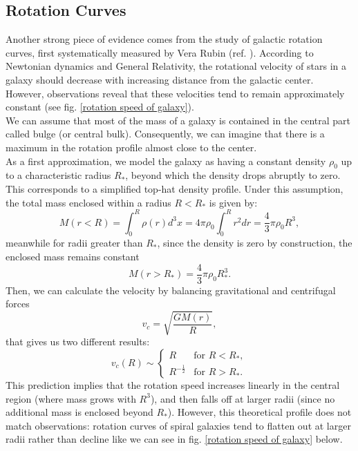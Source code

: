 \subsection{Rotation Curves}
Another strong piece of evidence comes from the study of galactic rotation curves, first systematically measured by Vera Rubin (ref. \cite{Vera-Rubin}). According to Newtonian dynamics and General Relativity, the rotational velocity of stars in a galaxy should decrease with increasing distance from the galactic center. However, observations reveal that these velocities tend to remain approximately constant (see fig. \ref{rotation speed of galaxy}).\\
We can assume that most of the mass of a galaxy is contained in the central part called bulge (or central bulk). Consequently, we can imagine that there is a maximum in the rotation profile almost close to the center.\\
 As a first approximation, we model the galaxy as having a constant density $\rho_0$ up to a characteristic radius $R_*$, beyond which the density drops abruptly to zero. This corresponds to a simplified top-hat density profile.
 Under this assumption, the total mass enclosed within a radius $R < R_*$ is given by:
\begin{equation}
    M(r<R) = \int_0 ^R \rho(r) d^3 x=4\pi\rho_0 \int_0 ^R r^2 dr = \frac{4}{3} \pi \rho_0 R^3,
\end{equation}
meanwhile for radii greater than $R_*$, since the density is zero by construction, the enclosed mass remains constant
\begin{equation}
    M(r>R_*) = \frac{4}{3} \pi \rho_0 R^3_*.
\end{equation}
Then, we can calculate the velocity by balancing gravitational and centrifugal forces
\begin{equation}
    v_c = \sqrt{\frac{GM (r)}{R}},
\end{equation}
that gives us two different results:
\begin{equation}
    v_c(R) \sim 
    \begin{cases}
        R & \text{for } R < R_*, \\
        R^{-\frac{1}{2}} & \text{for } R > R_*.
    \end{cases}
\end{equation}
This prediction implies that the rotation speed increases linearly in the central region (where mass grows with $R^3$), and then falls off at larger radii (since no additional mass is enclosed beyond $R_*$).
However, this theoretical profile does not match observations: rotation curves of spiral galaxies tend to flatten out at larger radii rather than decline like we can see in fig. \ref{rotation speed of galaxy} below. 

